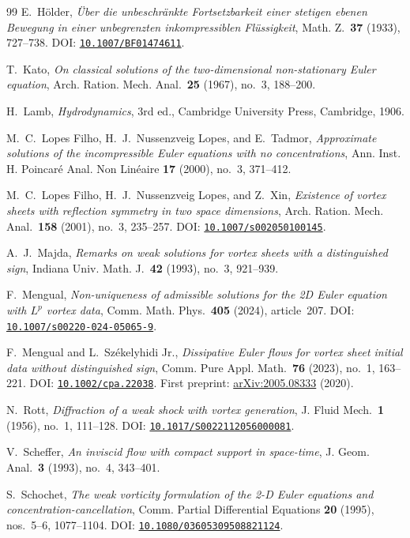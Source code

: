 \documentclass[11pt,a4paper,reqno]{amsart}
\theoremstyle{plain}
\theoremstyle{definition}
\theoremstyle{remark}
\numberwithin{equation}{section}
\newcommand{\doi}[1]{\href{https://doi.org/#1}{\nolinkurl{#1}}}
\begin{document}
\begin{thebibliography}{99}
E.~H\"older,
\emph{\"Uber die unbeschr\"ankte Fortsetzbarkeit einer stetigen ebenen Bewegung in einer unbegrenzten inkompressiblen Fl\"ussigkeit},
Math. Z.\ \textbf{37} (1933), 727--738.
DOI: \doi{10.1007/BF01474611}.

T.~Kato,
\emph{On classical solutions of the two-dimensional non-stationary Euler equation},
Arch. Ration. Mech. Anal.\ \textbf{25} (1967), no.~3, 188--200.

H.~Lamb,
\emph{Hydrodynamics}, 3rd ed., Cambridge University Press, Cambridge, 1906.

M.~C.~Lopes Filho, H.~J.~Nussenzveig Lopes, and E.~Tadmor,
\emph{Approximate solutions of the incompressible Euler equations with no concentrations},
Ann. Inst. H. Poincar\'e Anal. Non Lin\'eaire \textbf{17} (2000), no.~3, 371--412.

M.~C.~Lopes Filho, H.~J.~Nussenzveig Lopes, and Z.~Xin,
\emph{Existence of vortex sheets with reflection symmetry in two space dimensions},
Arch. Ration. Mech. Anal.\ \textbf{158} (2001), no.~3, 235--257.
DOI: \doi{10.1007/s002050100145}.

A.~J.~Majda,
\emph{Remarks on weak solutions for vortex sheets with a distinguished sign},
Indiana Univ. Math. J.\ \textbf{42} (1993), no.~3, 921--939.

F.~Mengual,
\emph{Non-uniqueness of admissible solutions for the 2D Euler equation with $L^p$ vortex data},
Comm. Math. Phys.\ \textbf{405} (2024), article~207.
DOI: \doi{10.1007/s00220-024-05065-9}.

F.~Mengual and L.~Sz\'ekelyhidi Jr.,
\emph{Dissipative Euler flows for vortex sheet initial data without distinguished sign},
Comm. Pure Appl. Math.\ \textbf{76} (2023), no.~1, 163--221.
DOI: \doi{10.1002/cpa.22038}.
First preprint: \href{https://arxiv.org/abs/2005.08333}{arXiv:2005.08333} (2020).

N.~Rott,
\emph{Diffraction of a weak shock with vortex generation},
J. Fluid Mech.\ \textbf{1} (1956), no.~1, 111--128.
DOI: \doi{10.1017/S0022112056000081}.

V.~Scheffer,
\emph{An inviscid flow with compact support in space-time},
J. Geom. Anal.\ \textbf{3} (1993), no.~4, 343--401.

S.~Schochet,
\emph{The weak vorticity formulation of the 2-D Euler equations and concentration-cancellation},
Comm. Partial Differential Equations \textbf{20} (1995), nos.~5--6, 1077--1104.
DOI: \doi{10.1080/03605309508821124}.


\end{thebibliography}
\end{document}
